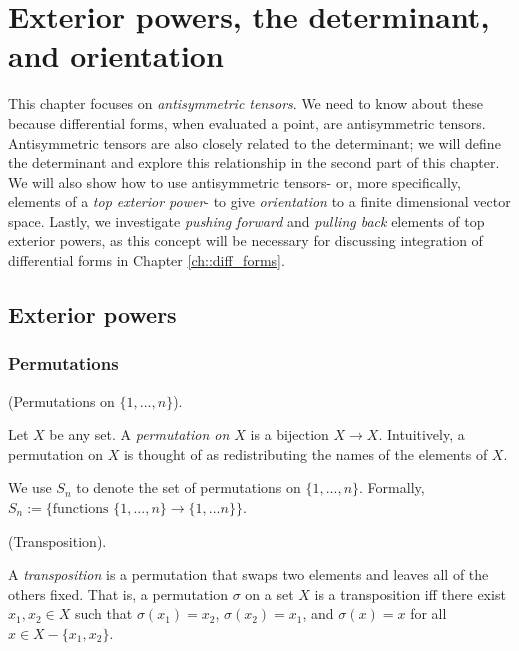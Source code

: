 \chapter{Exterior powers, the determinant, and orientation}
\label{ch::exterior_pwrs}

This chapter focuses on \textit{antisymmetric tensors}. We need to know about these because differential forms, when evaluated a point, are antisymmetric tensors. Antisymmetric tensors are also closely related to the determinant; we will define the determinant and explore this relationship in the second part of this chapter. We will also show how to use antisymmetric tensors- or, more specifically, elements of a \textit{top exterior power}- to give \textit{orientation} to a finite dimensional vector space. Lastly, we investigate \textit{pushing forward} and \textit{pulling back} elements of top exterior powers, as this concept will be necessary for discussing integration of differential forms in Chapter \ref{ch::diff_forms}.

\section{Exterior powers}

\subsection*{Permutations}

\begin{defn}
    (Permutations on $\{1, ..., n\}$).
    
    Let $X$ be any set. A \textit{permutation on $X$} is a bijection $X \rightarrow X$. Intuitively, a permutation on $X$ is thought of as redistributing the names of the elements of $X$.
    
    We use $S_n$ to denote the set of permutations on $\{1, ..., n\}$. Formally, $S_n := \{ \text{functions } \text{$\{1, ..., n\} \rightarrow \{1, ... n \}$} \}$.
\end{defn}

\begin{defn}
    (Transposition).

    A \textit{transposition} is a permutation that swaps two elements and leaves all of the others fixed. That is, a permutation $\sigma$ on a set $X$ is a transposition iff there exist $x_1, x_2 \in X$ such that $\sigma(x_1) = x_2$, $\sigma(x_2) = x_1$, and $\sigma(x) = x$ for all $x \in X - \{x_1, x_2\}$.
\end{defn}

